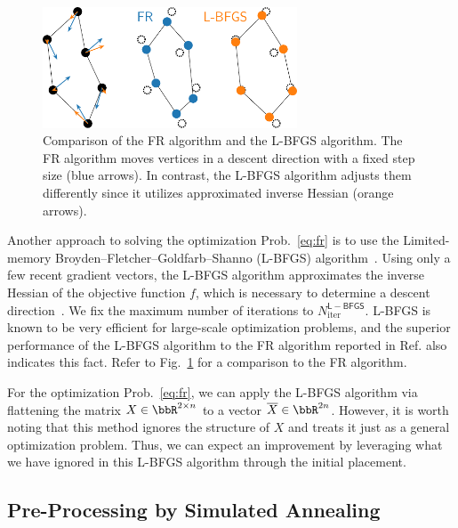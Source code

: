 \documentclass[dvipdfmx,10pt,journal,compsoc]{IEEEtran}
\begin{document}
\begin{figure}[t]
  \centering
  \includegraphics[height=3.59cm]{comparison/comparison_FRandLBFGS.pdf}
  \caption{
    Comparison of the FR algorithm and the L-BFGS algorithm.
    The FR algorithm moves vertices in a descent direction with a fixed step size (blue arrows). In contrast, the L-BFGS algorithm adjusts them differently since it utilizes approximated inverse Hessian (orange arrows).
  }
  \label{fig:comparisonFRandLBFGS}
\end{figure}

Another approach to solving the optimization Prob.~\eqref{eq:fr} is to use the Limited-memory Broyden--Fletcher--Goldfarb--Shanno (L-BFGS) algorithm~\cite{6183577}.
Using only a few recent gradient vectors, the L-BFGS algorithm approximates the inverse Hessian of the objective function $f$, which is necessary to determine a descent direction~\cite{liuLimitedMemoryBFGS1989}.
We fix the maximum number of iterations to $N_\mathrm{iter}^{\mathsf{L-BFGS}}$.
L-BFGS is known to be very efficient for large-scale optimization problems, and the superior performance of the L-BFGS algorithm to the FR algorithm reported in Ref.\cite{6183577} also indicates this fact. Refer to Fig.~\ref{fig:comparisonFRandLBFGS} for a comparison to the FR algorithm.

For the optimization Prob.~\eqref{eq:fr}, we can apply the L-BFGS algorithm via flattening the matrix $X \in \bbR^{2 \times n}$ to a vector $\overline{X} \in \bbR^{2n}$.
However, it is worth noting that this method ignores the structure of $X$ and treats it just as a general optimization problem.
Thus, we can expect an improvement by leveraging what we have ignored in this L-BFGS algorithm through the initial placement.

\subsection{Pre-Processing by Simulated Annealing}\label{ssec:preprocessing}
\end{document}
